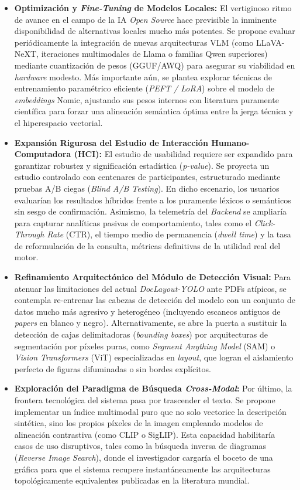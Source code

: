 \documentclass[a4paper]{report}
\begin{document}
\begin{itemize}
    \item \textbf{Optimización y \textit{Fine-Tuning} de Modelos Locales:} El vertiginoso ritmo de avance en el campo de la IA \textit{Open Source} hace previsible la inminente disponibilidad de alternativas locales mucho más potentes. Se propone evaluar periódicamente la integración de nuevas arquitecturas VLM (como LLaVA-NeXT, iteraciones multimodales de Llama o familias Qwen superiores) mediante cuantización de pesos (GGUF/AWQ) para asegurar su viabilidad en \textit{hardware} modesto. Más importante aún, se plantea explorar técnicas de entrenamiento paramétrico eficiente (\textit{PEFT / LoRA}) sobre el modelo de \textit{embeddings} Nomic, ajustando sus pesos internos con literatura puramente científica para forzar una alineación semántica óptima entre la jerga técnica y el hiperespacio vectorial.

    \item \textbf{Expansión Rigurosa del Estudio de Interacción Humano-Computadora (HCI):} El estudio de usabilidad requiere ser expandido para garantizar robustez y significación estadística (\textit{p-value}). Se proyecta un estudio controlado con centenares de participantes, estructurado mediante pruebas A/B ciegas (\textit{Blind A/B Testing}). En dicho escenario, los usuarios evaluarían los resultados híbridos frente a los puramente léxicos o semánticos sin sesgo de confirmación. Asimismo, la telemetría del \textit{Backend} se ampliaría para capturar analíticas pasivas de comportamiento, tales como el \textit{Click-Through Rate} (CTR), el tiempo medio de permanencia (\textit{dwell time}) y la tasa de reformulación de la consulta, métricas definitivas de la utilidad real del motor.

    \item \textbf{Refinamiento Arquitectónico del Módulo de Detección Visual:} Para atenuar las limitaciones del actual \textit{DocLayout-YOLO} ante PDFs atípicos, se contempla re-entrenar las cabezas de detección del modelo con un conjunto de datos mucho más agresivo y heterogéneo (incluyendo escaneos antiguos de \textit{papers} en blanco y negro). Alternativamente, se abre la puerta a sustituir la detección de cajas delimitadoras (\textit{bounding boxes}) por arquitecturas de segmentación por píxeles puras, como \textit{Segment Anything Model} (SAM) o \textit{Vision Transformers} (ViT) especializadas en \textit{layout}, que logran el aislamiento perfecto de figuras difuminadas o sin bordes explícitos.

    \item \textbf{Exploración del Paradigma de Búsqueda \textit{Cross-Modal}:} Por último, la frontera tecnológica del sistema pasa por trascender el texto. Se propone implementar un índice multimodal puro que no solo vectorice la descripción sintética, sino los propios píxeles de la imagen empleando modelos de alineación contrastiva (como CLIP o SigLIP). Esta capacidad habilitaría casos de uso disruptivos, tales como la búsqueda inversa de diagramas (\textit{Reverse Image Search}), donde el investigador cargaría el boceto de una gráfica para que el sistema recupere instantáneamente las arquitecturas topológicamente equivalentes publicadas en la literatura mundial.
\end{itemize}
\end{document}
